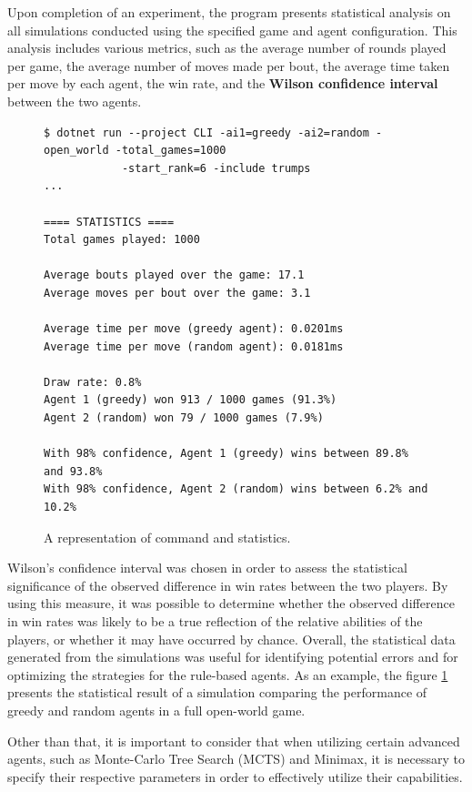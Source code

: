 Upon completion of an experiment, the program presents statistical analysis on all simulations conducted using the specified game and agent configuration. This analysis includes various metrics, such as the average number of rounds played per game, the average number of moves made per bout, the average time taken per move by each agent, the win rate, and the \textbf{Wilson confidence interval} between the two agents.

\begin{figure}[h]
\captionsetup{justification=centering}
\begin{lstlisting}
$ dotnet run --project CLI -ai1=greedy -ai2=random -open_world -total_games=1000 
			-start_rank=6 -include trumps
...

==== STATISTICS ====
Total games played: 1000

Average bouts played over the game: 17.1
Average moves per bout over the game: 3.1

Average time per move (greedy agent): 0.0201ms
Average time per move (random agent): 0.0181ms

Draw rate: 0.8%
Agent 1 (greedy) won 913 / 1000 games (91.3%)
Agent 2 (random) won 79 / 1000 games (7.9%)

With 98% confidence, Agent 1 (greedy) wins between 89.8% and 93.8% 
With 98% confidence, Agent 2 (random) wins between 6.2% and 10.2% 
\end{lstlisting}
\caption{A representation of command and statistics.}
\label{fig:statistics}
\end{figure}

Wilson's confidence interval was chosen in order to assess the statistical significance of the observed difference in win rates between the two players. By using this measure, it was possible to determine whether the observed difference in win rates was likely to be a true reflection of the relative abilities of the players, or whether it may have occurred by chance. Overall, the statistical data generated from the simulations was useful for identifying potential errors and for optimizing the strategies for the rule-based agents. As an example, the figure \ref{fig:statistics}  presents the statistical result of a simulation comparing the performance of greedy and random agents in a full open-world game.

Other than that, it is important to consider that when utilizing certain advanced agents, such as Monte-Carlo Tree Search (MCTS) and Minimax, it is necessary to specify their respective parameters in order to effectively utilize their capabilities. 

